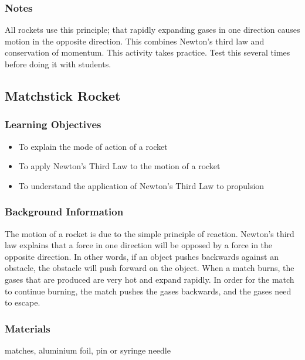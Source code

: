 \subsubsection*{Notes}
All rockets use this principle; that rapidly expanding gases in one direction causes motion in the opposite direction.  This combines Newton's third law and conservation of momentum.
This activity takes practice. Test this several times before doing it with students.  

\subsection{Matchstick Rocket}

\subsubsection*{Learning Objectives}
\begin{itemize}
\item{To explain the mode of action of a rocket} 
\item{To apply Newton's Third Law to the motion of a rocket} 
\item{To understand the application of Newton's Third Law to propulsion} 
\end{itemize}

\subsubsection*{Background Information}
The motion of a rocket is due to the simple principle of reaction.  Newton's third law explains that a force in one direction will be opposed by a force in the opposite direction.  In other words, if an object pushes backwards against an obstacle, the obstacle will push forward on the object.  When a match burns, the gases that are produced are very hot and expand rapidly. In order for the match to continue burning, the match pushes the gases backwards, and the gases need to escape.

\subsubsection*{Materials}
matches, aluminium foil, pin or syringe needle

